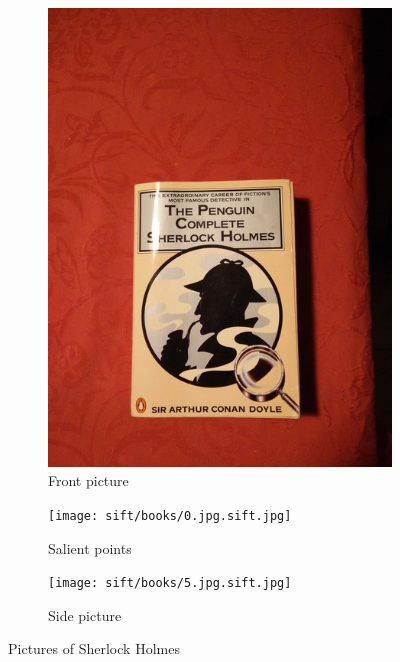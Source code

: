 \documentclass[10pt,a4paper]{article}
\begin{document}
\begin{figure}
    \centering
    \begin{subfigure}[b]{0.3\textwidth}
        \includegraphics[width=\textwidth]{sift/books/0.jpg}
        \caption{Front picture}
    \end{subfigure}
    \begin{subfigure}[b]{0.3\textwidth}
        \texttt{[image: sift/books/0.jpg.sift.jpg]}
        \caption{Salient points}
    \end{subfigure}
    \begin{subfigure}[b]{0.3\textwidth}
        \texttt{[image: sift/books/5.jpg.sift.jpg]}
        \caption{Side picture}
    \end{subfigure}
    \caption{Pictures of Sherlock Holmes}
\label{fig:sherlock}
\end{figure}
\end{document}
